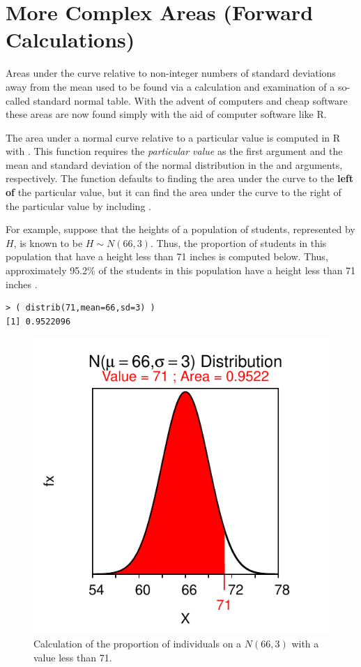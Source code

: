 \documentclass[10pt,openany]{book}\usepackage[]{graphicx}\usepackage[]{color}
\makeatletter
\newenvironment{kframe}{%
 \def\at@end@of@kframe{}%
 \ifinner\ifhmode%
  \def\at@end@of@kframe{\end{minipage}}%
  \begin{minipage}{\columnwidth}%
 \fi\fi%
 \def\FrameCommand##1{\hskip\@totalleftmargin \hskip-\fboxsep
 \colorbox{shadecolor}{##1}\hskip-\fboxsep
     \hskip-\linewidth \hskip-\@totalleftmargin \hskip\columnwidth}%
 \MakeFramed {\advance\hsize-\width
   \@totalleftmargin\z@ \linewidth\hsize
   \@setminipage}}%
 {\par\unskip\endMakeFramed%
 \at@end@of@kframe}
\newenvironment{knitrout}{}{} %
\makeatother
\begin{document}
\section[Forward Calculations]{More Complex Areas (Forward Calculations)}
\vspace{-12pt}
Areas under the curve relative to non-integer numbers of standard deviations away from the mean used to be found via a calculation and examination of a so-called standard normal table.  With the advent of computers and cheap software these areas are now found simply with the aid of computer software like R.

The area under a normal curve relative to a particular value is computed in R with .  This function requires the \textit{particular value} as the first argument and the mean and standard deviation of the normal distribution in the  and  arguments, respectively.  The  function defaults to finding the area under the curve to the \textbf{left of} the particular value, but it can find the area under the curve to the right of the particular value by including .

For example, suppose that the heights of a population of students, represented by $H$, is known to be $H\sim N(66,3)$.  Thus, the proportion of students in this population that have a height less than 71 inches is computed below. Thus, approximately 95.2\% of the students in this population have a height less than 71 inches .
\begin{knitrout}
\color{fgcolor}\begin{kframe}
\begin{verbatim}
> ( distrib(71,mean=66,sd=3) )
[1] 0.9522096
\end{verbatim}
\end{kframe}\begin{figure}[hbtp]

{\centering \includegraphics[width=.4\linewidth]{Figs/NormZCalc1-1} 

}

\caption[Calculation of the proportion of individuals on a $N(66,3)$ with a value less than 71]{Calculation of the proportion of individuals on a $N(66,3)$ with a value less than 71.}\label{fig:NormZCalc1}
\end{figure}


\end{knitrout}
\end{document}
